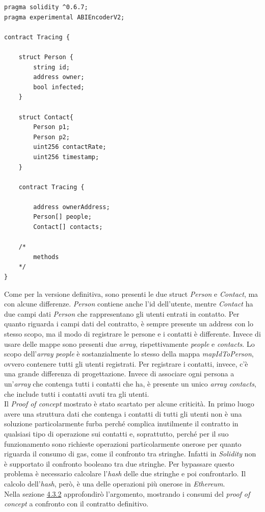 \mbox{\newline}
\begin{lstlisting}[language=Solidity]
pragma solidity ^0.6.7;
pragma experimental ABIEncoderV2;

contract Tracing {

    struct Person {
        string id;
        address owner;
        bool infected;
    }

    struct Contact{
        Person p1;
        Person p2;
        uint256 contactRate;
        uint256 timestamp;
    }

    contract Tracing {
    
        address ownerAddress;
        Person[] people;
        Contact[] contacts;

	/*
		methods
	*/
}

\end{lstlisting}
\mbox{\newline}
Come per la versione definitiva, sono presenti le due struct \textit{Person} e \textit{Contact}, ma con alcune differenze.
\textit{Person} contiene anche l'id dell'utente, mentre \textit{Contact} ha due campi dati \textit{Person} che rappresentano gli utenti entrati in contatto.
Per quanto riguarda i campi dati del contratto, è sempre presente un address con lo stesso scopo, ma il modo di registrare le persone e i contatti è differente. Invece di usare delle mappe sono presenti due \textit{array}, rispettivamente \textit{people} e \textit{contacts}. Lo scopo dell'\textit{array} \textit{people} è sostanzialmente lo stesso della mappa \textit{mapIdToPerson}, ovvero contenere tutti gli utenti registrati. Per registrare i contatti, invece, c'è una grande differenza di progettazione. Invece di associare ogni persona a un'\textit{array} che contenga tutti i contatti che ha, è presente un unico \textit{array contacts}, che include tutti i contatti avuti tra gli utenti.\\
Il \textit{Proof of concept} mostrato è stato scartato per alcune criticità. In primo luogo avere una struttura dati che contenga i contatti di tutti gli utenti non è una soluzione particolarmente furba perché complica inutilmente il contratto in qualsiasi tipo di operazione sui contatti e, soprattutto, perché per il suo funzionamento sono richieste operazioni particolarmente onerose per quanto riguarda il consumo di gas, come il confronto tra stringhe. Infatti in \textit{Solidity} non è supportato il confronto booleano tra due stringhe. Per bypassare questo problema è necessario calcolare l’\textit{hash} delle due stringhe e poi confrontarlo. Il calcolo dell’\textit{hash}, però, è una delle operazioni più onerose in \textit{Ethereum}.\\
Nella sezione \hyperref[sec:gas]{4.3.2} approfondirò l’argomento, mostrando i consumi del \textit{proof of concept} a confronto con il contratto definitivo.

